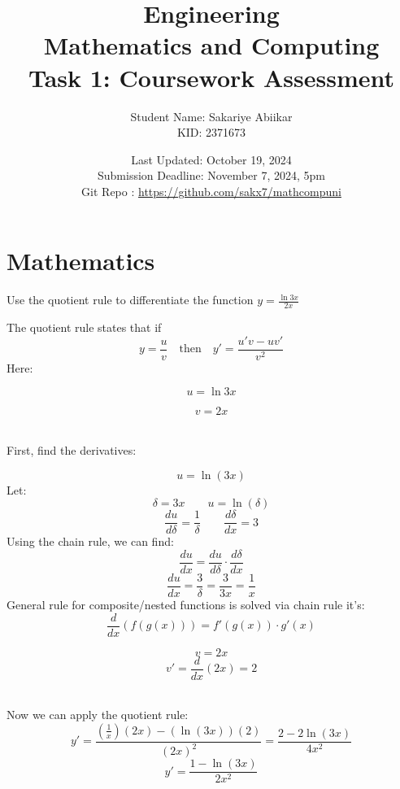 \documentclass[a4paper, 12pt]{report}
\title{\vspace{3em} \Huge \textbf{Engineering\\ Mathematics and Computing}\\ \vspace{1em} \Large Task 1: Coursework Assessment}
\author{Student Name: Sakariye Abiikar\\ KID: 2371673}
\date{Last Updated: October 19, 2024\\ Submission Deadline: November 7, 2024, 5pm \\[1em] Git Repo : \color{blue}\url{https://github.com/sakx7/mathcompuni}}
\begin{document}
    
    \maketitle
    \thispagestyle{empty}
    
    \newpage
    \thispagestyle{empty}

    \chapter{Mathematics}
    
    \newpage\centering\restoregeometry
    
    \setcounter{page}{1}

    \begin{tcolorbox}[title={\color{black}{\section{Q1}}}, colback=white, colframe=black!30!white, boxrule=0.4mm, width=1\textwidth]
        Use the quotient rule to differentiate the function \( y=\frac{\ln 3 x}{2 x} \)
    \end{tcolorbox}
    
    The quotient rule states that if
    \[y = \frac{u}{v} \quad \text{then} \quad y' = \frac{u'v - uv'}{v^2}\]
    Here: \\[5pt]
    \begin{minipage}{0.4\textwidth}
        \[u = \ln 3x\] 
    \end{minipage}\hspace{-8em}
    \begin{minipage}{0.4\textwidth}
        \[v = 2x \]
    \end{minipage}\\[20pt]
    First, find the derivatives:\\[10pt]
    \begin{minipage}{0.43\textwidth}\centering
    \[u = \ln(3x)\]
    Let:
    \[\delta = 3x \qquad u = \ln(\delta)\]
    \[\frac{du}{d\delta} = \frac{1}{\delta} \qquad \frac{d\delta}{dx} = 3\]
    Using the chain rule, we can find:
    \[\frac{du}{dx} = \frac{du}{d\delta} \cdot \frac{d\delta}{dx}\]
    \[\frac{du}{dx} = \frac{3}{\delta} = \frac{3}{3x}= \frac{1}{x}\]
    General rule for composite/nested functions is solved via chain rule it's:
    \[\frac{d}{dx}(f(g(x))) = f'(g(x))\cdot g'(x)\]
    \end{minipage}\hspace{1em}\vrule\hspace{-2.5em}
    \begin{minipage}{0.4\textwidth}
        \[v = 2x\]
        \[v' = \frac{d}{dx}(2x) = 2\]
    \end{minipage}\\[30pt]
    Now we can apply the quotient rule:
    \[y' = \frac{\left(\frac{1}{x}\right)(2x) - (\ln(3x))(2)}{(2x)^2} = \frac{2 - 2\ln (3x)}{4x^2}\]
    \[\boxed{y' = \frac{1 - \ln(3x)}{2x^2}}\]
    
\end{document}
